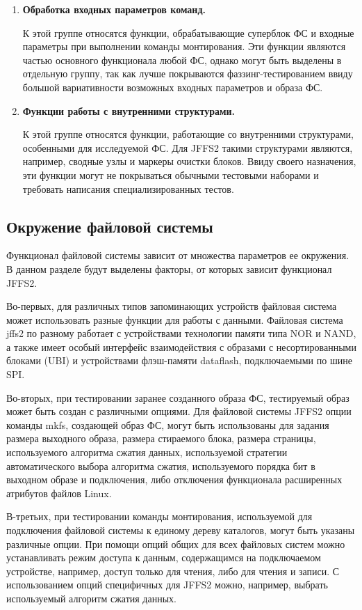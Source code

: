 \begin{enumerate}
	\item \textbf{Обработка входных параметров команд.}

	К этой группе относятся функции, обрабатывающие суперблок ФС и входные параметры при выполнении команды монтирования. Эти функции являются частью основного функционала любой ФС, однако могут быть выделены в отдельную группу, так как лучше покрываются фаззинг-тестированием ввиду большой вариативности возможных входных параметров и образа ФС.

	\item \textbf{Функции работы с внутренними структурами.}

	К этой группе относятся функции, работающие со внутренними структурами, особенными для исследуемой ФС. Для JFFS2 такими структурами являются, например, сводные узлы и маркеры очистки блоков. Ввиду своего назначения, эти функции могут не покрываться обычными тестовыми наборами и требовать написания специализированных тестов.
\end{enumerate}

\subsection{Окружение файловой системы}

Функционал файловой системы зависит от множества параметров ее окружения. В данном разделе будут выделены факторы, от которых зависит функционал JFFS2.

Во-первых, для различных типов запоминающих устройств файловая система может использовать разные функции для работы с данными. Файловая система jffs2 по разному работает с устройствами технологии памяти типа NOR и NAND, а также имеет особый интерфейс взаимодействия с образами с несортированными блоками (UBI) \cite{ubi} и устройствами флэш-памяти dataflash, подключаемыми по шине SPI. 

Во-вторых, при тестировании заранее созданного образа ФС, тестируемый образ может быть создан с различными опциями. Для файловой системы JFFS2 опции команды mkfs, создающей образ ФС, могут быть использованы для задания размера выходного образа, размера стираемого блока, размера страницы, используемого алгоритма сжатия данных, используемой стратегии автоматического выбора алгоритма сжатия, используемого порядка бит в выходном образе и подключения, либо отключения функционала расширенных атрибутов файлов Linux. 

В-третьих, при тестировании команды монтирования, используемой для подключения файловой системы к единому дереву каталогов, могут быть указаны различные опции. При помощи опций общих для всех файловых систем можно устанавливать режим доступа к данным, содержащимся на подключаемом устройстве, например, доступ только для чтения, либо для чтения и записи. С использованием опций специфичных для JFFS2 можно, например, выбрать используемый алгоритм сжатия данных.

